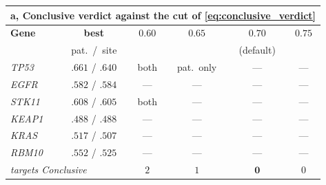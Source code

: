%
\footnotesize
\setlength{\tabcolsep}{4pt}
\renewcommand{\arraystretch}{1.1}

\begin{tabular}{l c c c c c}
\multicolumn{6}{l}{\textbf{a}, Conclusive verdict against the cut of
  \cref{eq:conclusive_verdict}}\\
\toprule
\textbf{Gene} & \textbf{best \auroc{}} &
  $\boldsymbol{0.60}$ & $\boldsymbol{0.65}$ &
  $\boldsymbol{0.70}$ & $\boldsymbol{0.75}$ \\
 & {\scriptsize pat.\ /\ site} & & & {\scriptsize (default)} & \\
\midrule
\textit{TP53}  & $.661$ / $.640$ & both & pat.\ only & --- & --- \\
\textit{EGFR}  & $.582$ / $.584$ & ---  & ---        & --- & --- \\
\textit{STK11} & $.608$ / $.605$ & both & ---        & --- & --- \\
\textit{KEAP1} & $.488$ / $.488$ & ---  & ---        & --- & --- \\
\textit{KRAS}  & $.517$ / $.507$ & ---  & ---        & --- & --- \\
\textit{RBM10} & $.552$ / $.525$ & ---  & ---        & --- & --- \\
\midrule
\multicolumn{2}{l}{\emph{targets Conclusive}} & $2$ & $1$ & $\mathbf{0}$ & $0$ \\
\bottomrule
\end{tabular}

\vspace{1.1em}

